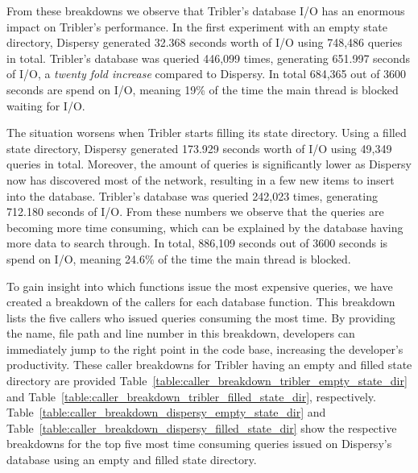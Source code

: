 From these breakdowns we observe that Tribler's database I/O has an enormous impact on Tribler's performance.
In the first experiment with an empty state directory, Dispersy generated 32.368 seconds worth of I/O using 748,486 queries in total. 
Tribler's database was queried 446,099 times, generating 651.997 seconds of I/O, a \emph{twenty fold increase} compared to Dispersy.
In total 684,365 out of 3600 seconds are spend on I/O, meaning 19\% of the time the main thread is blocked waiting for I/O.

The situation worsens when Tribler starts filling its state directory.
Using a filled state directory, Dispersy generated 173.929 seconds worth of I/O using 49,349 queries in total.
Moreover, the amount of queries is significantly lower as Dispersy now has discovered most of the network, resulting in a few new items to insert into the database.
Tribler's database was queried 242,023 times, generating 712.180 seconds of I/O.
From these numbers we observe that the queries are becoming more time consuming, which can be explained by the database having more data to search through.
In total, 886,109 seconds out of 3600 seconds is spend on I/O, meaning 24.6\% of the time the main thread is blocked.

To gain insight into which functions issue the most expensive queries, we have created a breakdown of the callers for each database function.
This breakdown lists the five callers who issued queries consuming the most time.
By providing the name, file path and line number in this breakdown, developers can immediately jump to the right point in the code base, increasing the developer's productivity.
These caller breakdowns for Tribler having an empty and filled state directory are provided Table~\ref{table:caller_breakdown_tribler_empty_state_dir} and Table~\ref{table:caller_breakdown_tribler_filled_state_dir}, respectively.
Table~\ref{table:caller_breakdown_dispersy_empty_state_dir} and Table~\ref{table:caller_breakdown_dispersy_filled_state_dir} show the respective breakdowns for the top five most time consuming queries issued on Dispersy's database using an empty and filled state directory.
	

